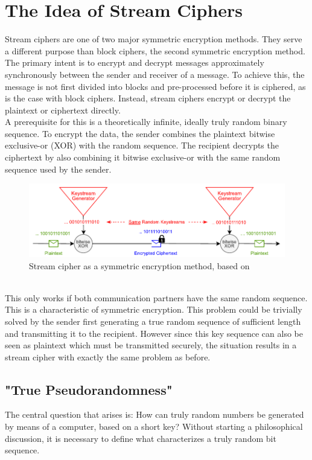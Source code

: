 \section{The Idea of Stream Ciphers}

Stream ciphers are one of two major symmetric encryption methods. They serve a different purpose than block ciphers, the second symmetric encryption method. The primary intent is to encrypt and decrypt messages approximately synchronously between the sender and receiver of a message. To achieve this, the message is not first divided into blocks and pre-processed before it is ciphered, as is the case with block ciphers. Instead, stream ciphers encrypt or decrypt the plaintext or ciphertext directly. \cite[p. 223]{Schneier.2006} \\

A prerequisite for this is a theoretically infinite, ideally truly random binary sequence. To encrypt the data, the sender combines the plaintext bitwise exclusive-or (XOR) with the random sequence. The recipient decrypts the ciphertext by also combining it bitwise exclusive-or with the same random sequence used by the sender.
\begin{figure}[h]
	\centering
	\includegraphics[width=1\textwidth]{carl/figures/figure_1_new_svg-raw.pdf}
	\caption{Stream cipher as a symmetric encryption method, based on \cite[p. 232]{Schneier.2006}}
	\label{fig:Figure_1}
\end{figure}
\\ This only works if both communication partners have the same random sequence. This is a characteristic of symmetric encryption. \cite[pp. 319-320]{Schmeh.2016} This problem could be trivially solved by the sender first generating a true random sequence of sufficient length and transmitting it to the recipient. However since this key sequence can also be seen as plaintext which must be transmitted securely, the situation results in a stream cipher with exactly the same problem as before.
\subsection{"True Pseudorandomness"}
The central question that arises is: How can truly random numbers be generated by means of a computer, based on a short key? \cite[p. 53]{Beutelspacher.2005} Without starting a philosophical discussion, it is necessary to define what characterizes a truly random bit sequence. \\

